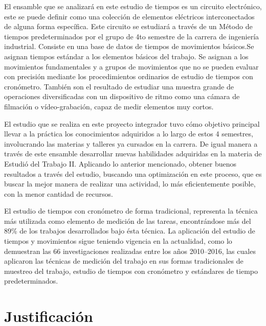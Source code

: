     El ensamble que se analizará en este estudio de tiempos es un circuito electrónico, este se puede definir como una colección de elementos eléctricos interconectados de alguna forma específica. Este circuito se estudiará a través de un Método de tiempos predeterminados por el grupo de 4to semestre de la carrera de ingeniería industrial. Consiste en una base de datos de tiempos de movimientos básicos.Se asignan tiempos estándar a los elementos básicos del trabajo. Se asignan a los movimientos fundamentales y a grupos de movimientos que no se pueden evaluar con precisión mediante los procedimientos ordinarios de estudio de tiempos con cronómetro. También son el resultado de estudiar una muestra grande de operaciones diversificadas con un dispositivo de ritmo como una cámara de filmación o vídeo-grabación, capaz de medir elementos muy cortos. \cite{parra2020analisis}
    
    El estudio que se realiza en este proyecto integrador tuvo cómo objetivo principal llevar a la práctica los conocimientos adquiridos a lo largo de estos 4 semestres, involucrando las materias y talleres ya cursados en la carrera. De igual manera a través de este ensamble desarrollar nuevas habilidades adquiridas en la materia de Estudió del Trabajo II. Aplicando lo anterior mencionado, obtener buenos resultados a través del estudio, buscando  una optimización en este proceso, que es buscar la mejor manera de realizar una actividad, lo más eficientemente posible, con la menor cantidad de recursos.
    
    El estudio de tiempos con cronómetro de forma tradicional, representa la técnica más utilizada como elemento de medición de las tareas, encontrándose más del 89\% de los trabajos desarrollados bajo ésta técnica.
    La aplicación del estudio de tiempos y movimientos sigue teniendo vigencia en la actualidad, como lo demuestran las 66 investigaciones realizadas entre los años 2010–2016, las cuales aplicaron las técnicas de medición del trabajo en sus formas tradicionales de muestreo del trabajo, estudio de tiempos con cronómetro y estándares de tiempo predeterminados.
    
     
    \section{Justificación}
    
